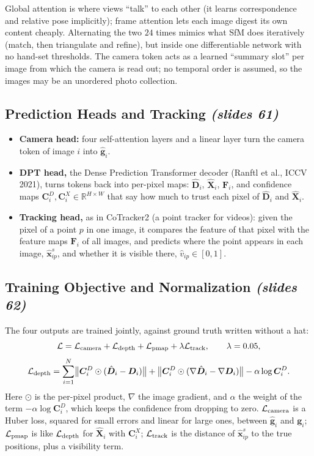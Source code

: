 \documentclass[11pt,a4paper]{article}
\newcommand{\slr}[1]{\texorpdfstring{\emph{(slides #1)}}{(slides #1)}}
\newcommand{\R}{\mathbb{R}}
\theoremstyle{definition}
\theoremstyle{plain}
\theoremstyle{remark}
\begin{document}
\begin{intuition}
Global attention is where views ``talk'' to each other (it learns correspondence and relative pose implicitly); frame attention lets each image digest its own content cheaply. Alternating the two $24$ times mimics what SfM does iteratively (match, then triangulate and refine), but inside one differentiable network with no hand-set thresholds. The camera token acts as a learned ``summary slot'' per image from which the camera is read out; no temporal order is assumed, so the images may be an unordered photo collection.
\end{intuition}

\subsection{Prediction Heads and Tracking \slr{61}}
\begin{itemize}
\item \textbf{Camera head:} four self-attention layers and a linear layer turn the camera token of image $i$ into $\hat{\bm g}_i$.
\item \textbf{DPT head,} the Dense Prediction Transformer decoder (Ranftl et al., ICCV 2021), turns tokens back into per-pixel maps: $\hat{\bm D}_i$, $\hat{\bm X}_i$, $\bm F_i$, and confidence maps $\bm C^D_i,\bm C^X_i\in\R^{H\times W}$ that say how much to trust each pixel of $\hat{\bm D}_i$ and $\hat{\bm X}_i$.
\item \textbf{Tracking head,} as in CoTracker2 (a point tracker for videos): given the pixel of a point $p$ in one image, it compares the feature of that pixel with the feature maps $\bm F_i$ of all images, and predicts where the point appears in each image, $\hat{\bm x}^s_{ip}$, and whether it is visible there, $\hat v_{ip}\in[0,1]$.
\end{itemize}

\subsection{Training Objective and Normalization \slr{62}}
The four outputs are trained jointly, against ground truth written without a hat:
\[
\mathcal L=\mathcal L_{\rm camera}+\mathcal L_{\rm depth}+\mathcal L_{\rm pmap}+\lambda\mathcal L_{\rm track},\qquad\lambda=0.05,
\]
\[
\mathcal L_{\rm depth}=\sum_{i=1}^N\bigl\lVert\bm C^D_i\odot(\hat{\bm D}_i-\bm D_i)\bigr\rVert+\bigl\lVert\bm C^D_i\odot(\nabla\hat{\bm D}_i-\nabla\bm D_i)\bigr\rVert-\alpha\log\bm C^D_i .
\]
Here $\odot$ is the per-pixel product, $\nabla$ the image gradient, and $\alpha$ the weight of the term $-\alpha\log\bm C^D_i$, which keeps the confidence from dropping to zero. $\mathcal L_{\rm camera}$ is a Huber loss, squared for small errors and linear for large ones, between $\hat{\bm g}_i$ and $\bm g_i$; $\mathcal L_{\rm pmap}$ is like $\mathcal L_{\rm depth}$ for $\hat{\bm X}_i$ with $\bm C^X_i$; $\mathcal L_{\rm track}$ is the distance of $\hat{\bm x}^s_{ip}$ to the true positions, plus a visibility term.
\end{document}
